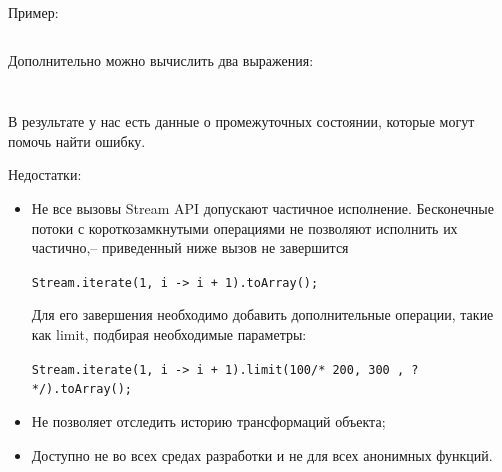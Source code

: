 \begin{itemize}
	Пример: 
	\inputminted{java}{chapter1/code/PartialEvaluationFull.java}
	Дополнительно можно вычислить два выражения:
	\inputminted{java}{chapter1/code/PartialEvaluation1.java}
	\inputminted{java}{chapter1/code/PartialEvaluation2.java}
	В результате у нас есть данные о промежуточных состоянии, которые могут помочь найти ошибку.
	
	Недостатки:
	\begin{itemize}
		\item Не все вызовы Stream API допускают частичное исполнение. Бесконечные потоки с короткозамкнутыми операциями не позволяют исполнить их частично,-- приведенный ниже вызов не завершится
		
		\texttt{Stream.iterate(1, i -> i + 1).toArray();}
		
		Для его завершения необходимо добавить дополнительные операции, такие как limit, подбирая необходимые параметры:
		
		\texttt{Stream.iterate(1, i -> i + 1).limit(100/* 200, 300 , ? */).toArray();}
		\item Не позволяет отследить историю трансформаций объекта;
		\item Доступно не во всех средах разработки и не для всех анонимных функций.
	\end{itemize}
\end{itemize}

